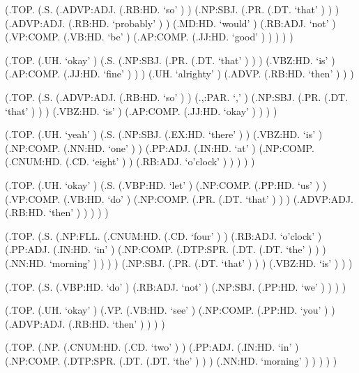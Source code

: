 \documentclass[10pt]{article}
\begin{document}
\begin{parsetree}  (.TOP. (.S. (.ADVP:ADJ. (.RB:HD. `so' ) ) (.NP:SBJ. (.PR. (.DT. `that' ) ) ) (.ADVP:ADJ. (.RB:HD. `probably' ) ) (.MD:HD. `would' ) (.RB:ADJ. `not' ) (.VP:COMP. (.VB:HD. `be' ) (.AP:COMP. (.JJ:HD. `good' ) ) ) ) ) \end{parsetree}

\begin{parsetree}  (.TOP. (.UH. `okay' ) (.S. (.NP:SBJ. (.PR. (.DT. `that' ) ) ) (.VBZ:HD. `is' ) (.AP:COMP. (.JJ:HD. `fine' ) ) ) (.UH. `alrighty' ) (.ADVP. (.RB:HD. `then' ) ) ) \end{parsetree}

\begin{parsetree}  (.TOP. (.S. (.ADVP:ADJ. (.RB:HD. `so' ) ) (.,:PAR. `,' ) (.NP:SBJ. (.PR. (.DT. `that' ) ) ) (.VBZ:HD. `is' ) (.AP:COMP. (.JJ:HD. `okay' ) ) ) ) \end{parsetree}

\begin{parsetree}  (.TOP. (.UH. `yeah' ) (.S. (.NP:SBJ. (.EX:HD. `there' ) ) (.VBZ:HD. `is' ) (.NP:COMP. (.NN:HD. `one' ) ) (.PP:ADJ. (.IN:HD. `at' ) (.NP:COMP. (.CNUM:HD. (.CD. `eight' ) ) (.RB:ADJ. `o'clock' ) ) ) ) ) \end{parsetree}

\begin{parsetree}  (.TOP. (.UH. `okay' ) (.S. (.VBP:HD. `let' ) (.NP:COMP. (.PP:HD. `us' ) ) (.VP:COMP. (.VB:HD. `do' ) (.NP:COMP. (.PR. (.DT. `that' ) ) ) (.ADVP:ADJ. (.RB:HD. `then' ) ) ) ) ) \end{parsetree}

\begin{parsetree}  (.TOP. (.S. (.NP:FLL. (.CNUM:HD. (.CD. `four' ) ) (.RB:ADJ. `o'clock' ) (.PP:ADJ. (.IN:HD. `in' ) (.NP:COMP. (.DTP:SPR. (.DT. (.DT. `the' ) ) ) (.NN:HD. `morning' ) ) ) ) (.NP:SBJ. (.PR. (.DT. `that' ) ) ) (.VBZ:HD. `is' ) ) ) \end{parsetree}

\begin{parsetree}  (.TOP. (.S. (.VBP:HD. `do' ) (.RB:ADJ. `not' ) (.NP:SBJ. (.PP:HD. `we' ) ) ) ) \end{parsetree}

\begin{parsetree}  (.TOP. (.UH. `okay' ) (.VP. (.VB:HD. `see' ) (.NP:COMP. (.PP:HD. `you' ) ) (.ADVP:ADJ. (.RB:HD. `then' ) ) ) ) \end{parsetree}

\begin{parsetree}  (.TOP. (.NP. (.CNUM:HD. (.CD. `two' ) ) (.PP:ADJ. (.IN:HD. `in' ) (.NP:COMP. (.DTP:SPR. (.DT. (.DT. `the' ) ) ) (.NN:HD. `morning' ) ) ) ) ) \end{parsetree}
\end{document}
